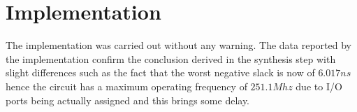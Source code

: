 \section{Implementation}
The implementation was carried out without any warning. The data reported by the implementation confirm the conclusion derived in the synthesis step with slight differences such as the fact that the worst negative slack is now of $6.017ns$ hence the circuit has a maximum operating frequency of $251.1Mhz$ due to I/O ports being actually assigned and this brings some delay. 
